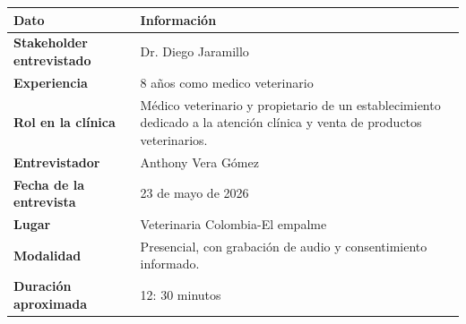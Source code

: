 \documentclass[
]{article}
\newcounter{none} %
\begin{document}
{\def\LTcaptype{none} %
\begin{longtable}[]{@{}
  >{\raggedright\arraybackslash}p{}
  >{\raggedright\arraybackslash}p{}@{}}
\toprule\noalign{}
\begin{minipage}[b]{\linewidth}\centering
\textbf{Dato}
\end{minipage} & \begin{minipage}[b]{\linewidth}\centering
\textbf{Información}
\end{minipage} \\
\midrule\noalign{}
\endhead
\bottomrule\noalign{}
\endlastfoot
\textbf{Stakeholder entrevistado} &
\begin{minipage}[t]{\linewidth}\raggedright
Dr. Diego Jaramillo
\end{minipage} \\
\textbf{Experiencia} & \begin{minipage}[t]{\linewidth}\raggedright
8 años como medico veterinario
\end{minipage} \\
\textbf{Rol en la clínica} & \begin{minipage}[t]{\linewidth}\raggedright
Médico veterinario y propietario de un establecimiento dedicado a la
atención clínica y venta de productos veterinarios.
\end{minipage} \\
\textbf{Entrevistador} & \begin{minipage}[t]{\linewidth}\raggedright
Anthony Vera Gómez
\end{minipage} \\
\textbf{Fecha de la entrevista} &
\begin{minipage}[t]{\linewidth}\raggedright
23 de mayo de 2026
\end{minipage} \\
\textbf{Lugar} & \begin{minipage}[t]{\linewidth}\raggedright
Veterinaria Colombia-El empalme
\end{minipage} \\
\textbf{Modalidad} & \begin{minipage}[t]{\linewidth}\raggedright
Presencial, con grabación de audio y consentimiento informado.
\end{minipage} \\
\textbf{Duración aproximada} &
\begin{minipage}[t]{\linewidth}\raggedright
12: 30 minutos

\end{minipage}
\end{longtable}}
\end{document}
